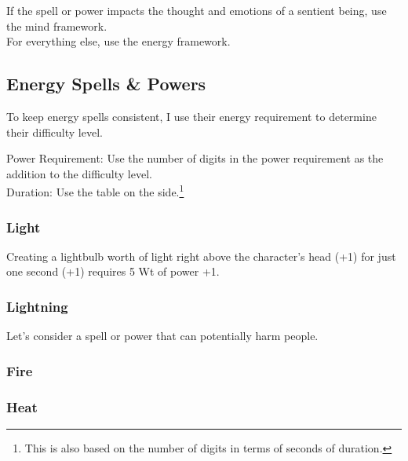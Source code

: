 \documentclass{LegrandOrangeTufteBook}
\newcommand{\term}[1]{\textcolor{colorTerm}{#1}}
\begin{document}
If the spell or power impacts the thought and emotions of a sentient being, use the mind framework.\\

For everything else, use the energy framework.\\

\subsection*{Energy Spells \& Powers}

To keep energy spells consistent,
I use their energy requirement to determine their \term{difficulty level}.

Power Requirement: Use the number of digits in the power requirement as the addition to the \term{difficulty level}.\\
Duration: Use the table on the side.\footnote{This is also based on the number of digits in terms of seconds of duration.}
\marginpar{
	\footnotesize
	
}

\marginpar{
	\footnotesize
	
}


\subsubsection*{Light}

Creating a lightbulb worth of light right above the character's head (+1) for just one second (+1) requires 5 Wt of power +1.\\

\subsubsection*{Lightning}
Let's consider a spell or power that can potentially harm people.

\subsubsection*{Fire}

\subsubsection*{Heat}
\end{document}
